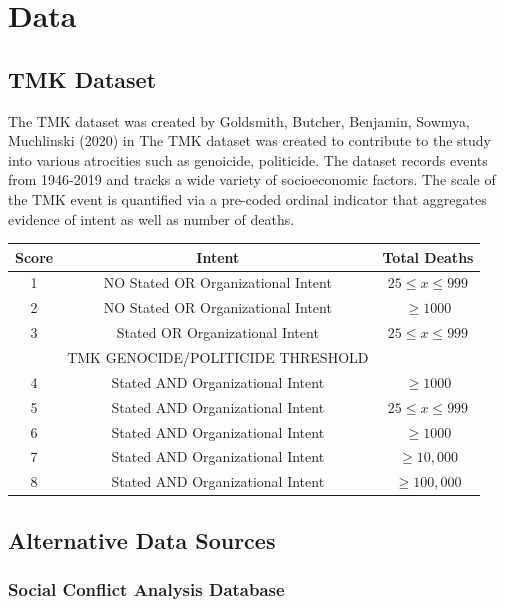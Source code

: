 \chapter{Data}\label{ch:style}
\usepackage{graphicx}
\usepackage[export]{adjustbox}
\section{TMK Dataset}
The TMK dataset was created by Goldsmith, Butcher, Benjamin, Sowmya, Muchlinski (2020) in  
The TMK dataset was created to contribute to the study into various atrocities such as genoicide, politicide. The dataset records events from 1946-2019 and tracks a wide variety of socioeconomic factors. The scale of the TMK event is quantified via a pre-coded ordinal indicator that aggregates evidence of intent as well as number of deaths.

\begin{center}
 \begin{tabular}{||c c c||} 
 \hline
 Score & Intent & Total Deaths\\ [1ex] 
 \hline
 1 & NO Stated OR Organizational Intent & $25 \leq x \leq 999$ \\ [1ex] 
 \hline
 2 & NO Stated OR Organizational Intent &  $\geq 1000$  \\ [1ex] 
 \hline
 3 & Stated OR Organizational Intent & $25 \leq x \leq 999$ \\ [1ex]  
 \hline
  & TMK GENOCIDE/POLITICIDE THRESHOLD & \\
 \hline
 4 & Stated AND Organizational Intent  &  $\geq 1000$  \\ [1ex] 
 \hline
  5 & Stated AND Organizational Intent  & $25 \leq x \leq 999$  \\ [1ex] 
 \hline
  6 & Stated AND Organizational Intent  &  $\geq 1000$   \\ [1ex] 
 \hline
  7 & Stated AND Organizational Intent  &  $\geq 10,000$   \\ [1ex] 
 \hline
  8 & Stated AND Organizational Intent  &  $\geq 100,000$   \\ [1ex] 
 \hline
\end{tabular}
\end{center}

\section{Alternative Data Sources}
\subsection{Social Conflict Analysis Database}
